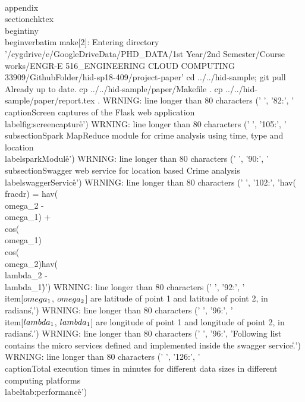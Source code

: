 \\appendix
\\section{chktex}
\\begin{tiny}
\\begin{verbatim}
make[2]: Entering directory '/cygdrive/e/GoogleDriveData/PHD_DATA/1st Year/2nd Semester/Course works/ENGR-E 516_ENGINEERING CLOUD COMPUTING 33909/GithubFolder/hid-sp18-409/project-paper'
cd ../../hid-sample; git pull
Already up to date.
cp ../../hid-sample/paper/Makefile .
cp ../../hid-sample/paper/report.tex .
WRNING: line longer than 80 characters
('      ', '82:', '\t\\caption{Screen captures of the Flask web application}\\label{fig:screencapture}\r\n')
WRNING: line longer than 80 characters
('      ', '105:', '\\subsection{Spark MapReduce module for crime analysis using time, type and location}\\label{sparkModule}\r\n')
WRNING: line longer than 80 characters
('      ', '90:', '\\subsection{Swagger web service for location based Crime analysis}\\label{swaggerService}\r\n')
WRNING: line longer than 80 characters
('      ', '102:', 'hav(\\frac{d}{r}) = hav(\\omega_2 - \\omega_1) + \\cos(\\omega_1)\\cos(\\omega_2)hav(\\lambda_2 - \\lambda_1)\r\n')
WRNING: line longer than 80 characters
('      ', '92:', '\\item[$\\omega_1$, $\\omega_2$] are latitude of point 1 and latitude of point 2, in radians,\r\n')
WRNING: line longer than 80 characters
('      ', '96:', '\\item[$\\lambda_1$, $\\lambda_1$] are longitude of point 1 and longitude of point 2, in radians.\r\n')
WRNING: line longer than 80 characters
('      ', '96:', 'Following list contains the micro services defined and implemented inside the swagger service.\r\n')
WRNING: line longer than 80 characters
('      ', '126:', '\t\\caption{Total execution times in minutes for different data sizes in different computing platforms}\\label{tab:performance}\r\n')

